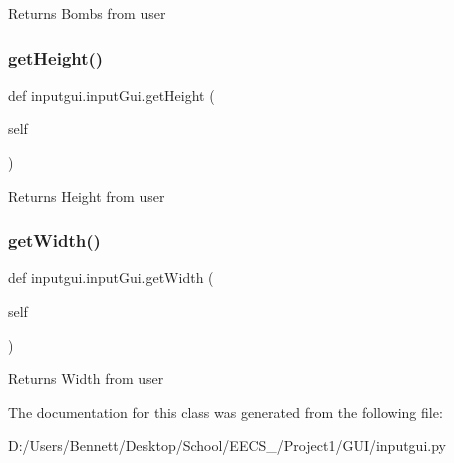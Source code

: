 \begin{DoxyVerb}Returns Bombs from user
\end{DoxyVerb}
 \mbox{\label{classinputgui_1_1input_gui_a0f58dcdd5da2004e96ce2e846aa8d70b}} 
\subsubsection{\texorpdfstring{get\+Height()}{getHeight()}}
{\footnotesize\ttfamily def inputgui.\+input\+Gui.\+get\+Height (\begin{DoxyParamCaption}\item[{}]{self }\end{DoxyParamCaption})}

\begin{DoxyVerb}Returns Height from user
\end{DoxyVerb}
 \mbox{\label{classinputgui_1_1input_gui_acb2f03dc243b615d56b85025e72fe83d}} 
\subsubsection{\texorpdfstring{get\+Width()}{getWidth()}}
{\footnotesize\ttfamily def inputgui.\+input\+Gui.\+get\+Width (\begin{DoxyParamCaption}\item[{}]{self }\end{DoxyParamCaption})}

\begin{DoxyVerb}Returns Width from user
\end{DoxyVerb}
 

The documentation for this class was generated from the following file\+:\begin{DoxyCompactItemize}
\item 
D\+:/\+Users/\+Bennett/\+Desktop/\+School/\+E\+E\+C\+S\+\_/\+Project1/\+G\+U\+I/inputgui.\+py\end{DoxyCompactItemize}

